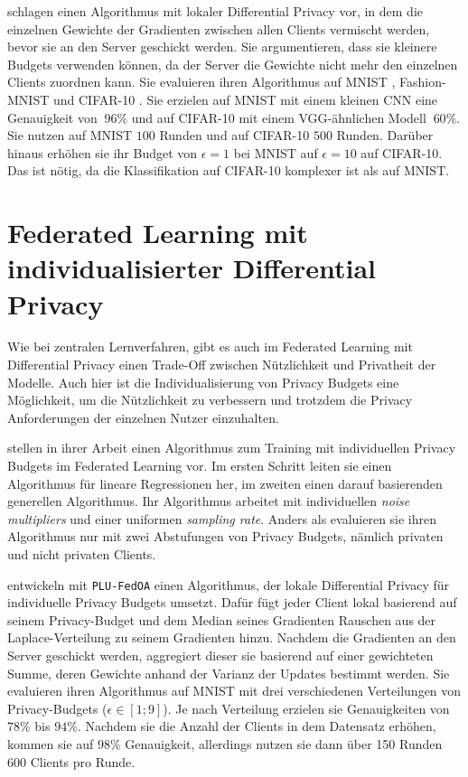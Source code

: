 \textcite{sun:2021} schlagen einen Algorithmus mit lokaler Differential Privacy vor, in dem die einzelnen Gewichte der Gradienten zwischen allen Clients vermischt werden, bevor sie an den Server geschickt werden. Sie argumentieren, dass sie kleinere Budgets verwenden können, da der Server die Gewichte nicht mehr den einzelnen Clients zuordnen kann. Sie evaluieren ihren Algorithmus auf MNIST \cite{lecun:1998}, Fashion-MNIST \cite{xiao:2017} und CIFAR-10 \cite{krizhevsky:2009}. Sie erzielen auf MNIST mit einem kleinen CNN eine Genauigkeit von $~96\%$ und auf CIFAR-10 mit einem VGG-ähnlichen Modell $~60\%$. Sie nutzen auf MNIST $100$ Runden und auf CIFAR-10 $500$ Runden. Darüber hinaus erhöhen sie ihr Budget von $\epsilon = 1$ bei MNIST auf $\epsilon = 10$ auf CIFAR-10. Das ist nötig, da die Klassifikation auf CIFAR-10 komplexer ist als auf MNIST.


\section{Federated Learning mit individualisierter Differential Privacy}\label{sec:rw-flidp}

Wie bei zentralen Lernverfahren, gibt es auch im Federated Learning mit Differential Privacy einen Trade-Off zwischen Nützlichkeit und Privatheit der Modelle. Auch hier ist die Individualisierung von Privacy Budgets eine Möglichkeit, um die Nützlichkeit zu verbessern und trotzdem die Privacy Anforderungen der einzelnen Nutzer einzuhalten.

\textcite{aldaghri:2023} stellen in ihrer Arbeit einen Algorithmus zum Training mit individuellen Privacy Budgets im Federated Learning vor. Im ersten Schritt leiten sie einen Algorithmus für lineare Regressionen her, im zweiten einen darauf basierenden generellen Algorithmus. Ihr Algorithmus arbeitet mit individuellen \textit{noise multipliers} und einer uniformen \textit{sampling rate}. Anders als \citeauthor{boenisch:2023} evaluieren sie ihren Algorithmus nur mit zwei Abstufungen von Privacy Budgets, nämlich privaten und nicht privaten Clients.

\textcite{yang:2021} entwickeln mit \texttt{PLU-FedOA} einen Algorithmus, der lokale Differential Privacy für individuelle Privacy Budgets umsetzt. Dafür fügt jeder Client lokal basierend auf seinem Privacy-Budget und dem Median seines Gradienten Rauschen aus der Laplace-Verteilung zu seinem Gradienten hinzu. Nachdem die Gradienten an den Server geschickt werden, aggregiert dieser sie basierend auf einer gewichteten Summe, deren Gewichte anhand der Varianz der Updates bestimmt werden. Sie evaluieren ihren Algorithmus auf MNIST mit drei verschiedenen Verteilungen von Privacy-Budgets ($\epsilon \in [1;9]$). Je nach Verteilung erzielen sie Genauigkeiten von $78\%$ bis $94\%$. Nachdem sie die Anzahl der Clients in dem Datensatz erhöhen, kommen sie auf $98\%$ Genauigkeit, allerdings nutzen sie dann über 150 Runden 600 Clients pro Runde.

